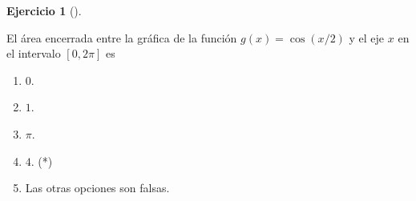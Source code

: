 \documentclass[
  a4paper,
]{scrreport}
\theoremstyle{definition}
\newtheorem{exercise}{Ejercicio}[chapter]
\theoremstyle{remark}
\begin{document}
\begin{exercise}[]\protect\hypertarget{exr-25}{}\label{exr-25}

El área encerrada entre la gráfica de la función \(g(x)=\cos(x/2)\) y el
eje \(x\) en el intervalo \([0,2\pi]\) es

\begin{enumerate}
\def\labelenumi{\alph{enumi}.}
\item
  \(0\).
\item
  \(1\).
\item
  \(\pi\).
\item
  \(4\). (*)
\item
  Las otras opciones son falsas.
\end{enumerate}

\end{exercise}
\end{document}

